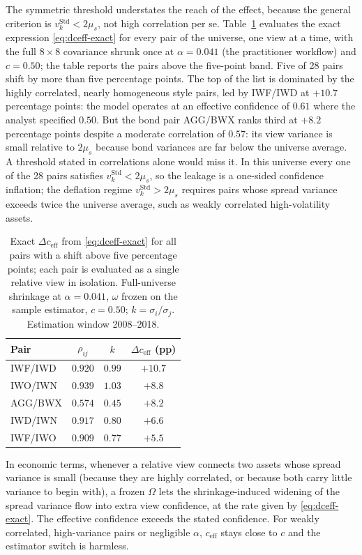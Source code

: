 \documentclass[a4paper,11pt]{article}
\theoremstyle{plain}
\theoremstyle{definition}
\newcommand{\Std}{\mathrm{Std}}
\newcommand{\eff}{\mathrm{eff}}
\begin{document}
The symmetric threshold understates the reach of the effect, because the
general criterion is $v_k^\Std < 2\mu_s$, not high correlation per se.
Table~\ref{tab:pairs} evaluates the exact expression
\eqref{eq:dceff-exact} for every pair of the universe, one view at a
time, with the full $8\times 8$ covariance shrunk once at
$\alpha = 0.041$ (the practitioner workflow) and $c = 0.50$; the table
reports the pairs above the five-point band. Five of 28 pairs shift by
more than five percentage points. The top of the list is dominated by
the highly correlated, nearly homogeneous style pairs, led by IWF/IWD at
$+10.7$ percentage points: the model operates at an effective
confidence of $0.61$ where the analyst specified $0.50$. But the bond
pair AGG/BWX ranks third at $+8.2$ percentage points despite a moderate
correlation of $0.57$: its view variance is small relative to $2\mu_s$
because bond variances are far below the universe average. A threshold
stated in correlations alone would miss it. In this universe every one
of the 28 pairs satisfies $v_k^\Std < 2\mu_s$, so the leakage is a
one-sided confidence inflation; the deflation regime
$v_k^\Std > 2\mu_s$ requires pairs whose spread variance exceeds twice
the universe average, such as weakly correlated high-volatility assets.

\begin{table}[H]
\centering
\caption{Exact $\Delta c_{\eff}$ from \eqref{eq:dceff-exact} for all
pairs with a shift above five percentage points; each pair is evaluated
as a single relative view in isolation. Full-universe shrinkage at
$\alpha = 0.041$, $\omega$ frozen on the sample estimator,
$c = 0.50$; $k = \sigma_i/\sigma_j$. Estimation window 2008--2018.}
\label{tab:pairs}
\begin{tabular}{lccc}
\toprule
Pair & $\rho_{ij}$ & $k$ & $\Delta c_{\eff}$ (pp) \\
\midrule
IWF/IWD & $0.920$ & $0.99$ & $+10.7$ \\
IWO/IWN & $0.939$ & $1.03$ & $+8.8$ \\
AGG/BWX & $0.574$ & $0.45$ & $+8.2$ \\
IWD/IWN & $0.917$ & $0.80$ & $+6.6$ \\
IWF/IWO & $0.909$ & $0.77$ & $+5.5$ \\
\bottomrule
\end{tabular}
\end{table}

In economic terms, whenever a relative view connects two
assets whose spread variance is small (because they are highly
correlated, or because both carry little variance to begin with), a
frozen $\Omega$ lets the shrinkage-induced widening of the spread
variance flow into extra view confidence, at the rate given by
\eqref{eq:dceff-exact}. The effective confidence exceeds the stated
confidence. For weakly correlated,
high-variance pairs or negligible $\alpha$, $c_{\eff}$ stays close to
$c$ and the estimator switch is harmless.
\end{document}
